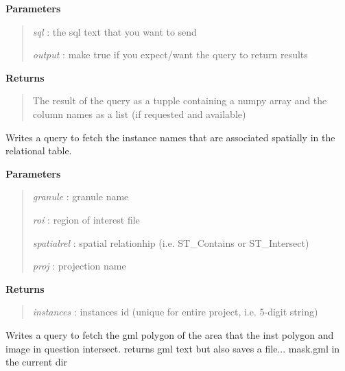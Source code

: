 \documentclass[letterpaper,10pt,english]{sphinxmanual}
\begin{document}
\begin{fulllineitems}
\begin{fulllineitems}
\textbf{Parameters}
\begin{quote}

\emph{sql}    : the sql text that you want to send

\emph{output} : make true if you expect/want the query to return results
\end{quote}

\textbf{Returns}
\begin{quote}

The result of the query as a tupple containing a numpy array and the column names as a list (if requested and available)
\end{quote}

\end{fulllineitems}


\begin{fulllineitems}
\label{code:Database.Database.qryGetInstances}
Writes a query to fetch the instance names that are
associated spatially in the relational table.

\textbf{Parameters}
\begin{quote}

\emph{granule}    : granule name

\emph{roi}        : region of interest file

\emph{spatialrel} : spatial relationhip (i.e. ST\_Contains or ST\_Intersect)

\emph{proj}       : projection name
\end{quote}

\textbf{Returns}
\begin{quote}

\emph{instances}  : instances id (unique for entire project, i.e. 5-digit string)
\end{quote}

\end{fulllineitems}


\begin{fulllineitems}
\label{code:Database.Database.qryMaskZone}
Writes a query to fetch the gml polygon of the area that the inst polygon and
image in question intersect.
returns gml text but also saves a file... mask.gml in the current dir


\end{fulllineitems}
\end{fulllineitems}
\end{document}
